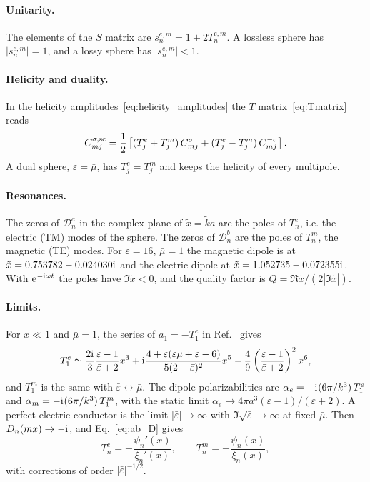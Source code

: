 \documentclass[
    pra,
    aps,
    reprint,
    onecolumn,
    amsmath,amssymb,
    a4paper,
    superscriptaddress,
    10pt,
    nofootinbib
]{revtex4-2}
\newcommand{\iu}{\mathrm{i}\mkern1mu}                 %
\newcommand{\eu}{\mathrm{e}\mkern1mu}                 %
\newcommand{\eb}{\bar{\varepsilon}}
\newcommand{\mb}{\bar{\mu}}
\begin{document}
\paragraph{Unitarity.}
The elements of the $S$ matrix are $s^{e,m}_n = 1 + 2T^{e,m}_n$.
A lossless sphere has $|s^{e,m}_n| = 1$, and a lossy sphere has $|s^{e,m}_n| < 1$.

\paragraph{Helicity and duality.}
In the helicity amplitudes~\eqref{eq:helicity_amplitudes} the $T$ matrix~\eqref{eq:Tmatrix} reads
\begin{equation}
    C^{\sigma,\rm sc}_{mj} = \frac{1}{2}\left[(T^e_j + T^m_j)\, C^{\sigma}_{mj} + (T^e_j - T^m_j)\, C^{-\sigma}_{mj}\right].
    \label{eq:T_helicity}
\end{equation}
A dual sphere, $\eb = \mb$, has $T^e_j = T^m_j$ and keeps the helicity of every multipole.

\paragraph{Resonances.}
The zeros of $\mathcal{D}^a_n$ in the complex plane of $\tilde{x} = \tilde{k} a$ are the poles of $T^e_n$, i.e. the electric (TM) modes of the sphere.
The zeros of $\mathcal{D}^b_n$ are the poles of $T^m_n$, the magnetic (TE) modes.
For $\eb = 16$, $\mb = 1$ the magnetic dipole is at $\tilde{x} = 0.753782 - 0.024030\iu$ and the electric dipole at $\tilde{x} = 1.052735 - 0.072355\iu$.
With $\eu^{-\iu\omega t}$ the poles have $\Im\tilde{x} < 0$, and the quality factor is $Q = \Re\tilde{x}/(2|\Im\tilde{x}|)$.

\paragraph{Limits.}
For $x \ll 1$ and $\mb = 1$, the series of $a_1 = -T^e_1$ in Ref.~\cite{Thesis} gives
\begin{equation}
    T^e_1 \simeq \frac{2\iu}{3}\frac{\eb - 1}{\eb + 2}x^3 + \iu\frac{4 + \eb(\eb\mb + \eb - 6)}{5(2+\eb)^2}x^5 - \frac{4}{9}\left(\frac{\eb - 1}{\eb + 2}\right)^2 x^6,
    \label{eq:a1_small}
\end{equation}
and $T^m_1$ is the same with $\eb \leftrightarrow \mb$.
The dipole polarizabilities are $\alpha_e = -\iu(6\pi/k^3)\, T^e_1$ and $\alpha_m = -\iu(6\pi/k^3)\, T^m_1$, with the static limit $\alpha_e \to 4\pi a^3 (\eb - 1)/(\eb + 2)$.
A perfect electric conductor is the limit $|\eb| \to \infty$ with $\Im\sqrt{\eb} \to \infty$ at fixed $\mb$.
Then $D_n(mx) \to -\iu$, and Eq.~\eqref{eq:ab_D} gives
\begin{equation}
    T^e_n = -\frac{\psi_n'(x)}{\xi_n'(x)}, \qquad
    T^m_n = -\frac{\psi_n(x)}{\xi_n(x)},
    \label{eq:pec}
\end{equation}
with corrections of order $|\eb|^{-1/2}$.
\end{document}
